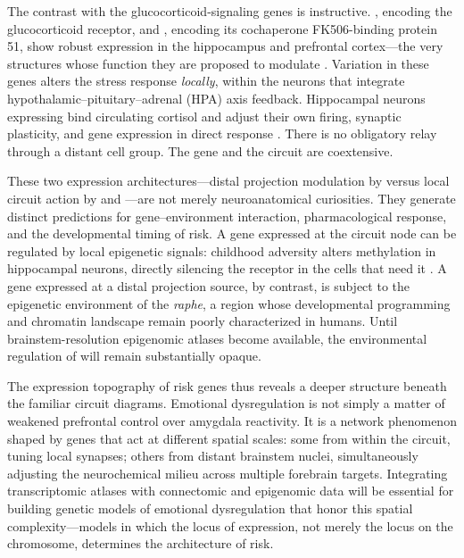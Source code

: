 The contrast with the glucocorticoid-signaling genes is instructive.
, encoding the glucocorticoid receptor, and , encoding
its cochaperone FK506-binding protein 51, show robust expression in the
hippocampus and prefrontal cortex---the very structures whose function they are
proposed to modulate \cite{perlman2007glucocorticoid, binder2009association}.
Variation in these genes alters the stress response \emph{locally}, within the
neurons that integrate hypothalamic--pituitary--adrenal (HPA) axis feedback.
Hippocampal neurons expressing  bind circulating cortisol and
adjust their own firing, synaptic plasticity, and gene expression in direct
response \cite{deangelis2019glucocorticoids}. There is no obligatory relay
through a distant cell group. The gene and the circuit are coextensive.

These two expression architectures---distal projection modulation by
 versus local circuit action by  and
---are not merely neuroanatomical curiosities. They generate
distinct predictions for gene--environment interaction, pharmacological
response, and the developmental timing of risk. A gene expressed at the circuit
node can be regulated by local epigenetic signals: childhood adversity alters
 methylation in hippocampal neurons, directly silencing the
receptor in the cells that need it \cite{mcgowan2009epigenetic}. A gene
expressed at a distal projection source, by contrast, is subject to the
epigenetic environment of the \emph{raphe}, a region whose developmental
programming and chromatin landscape remain poorly characterized in humans.
Until brainstem-resolution epigenomic atlases become available, the
environmental regulation of  will remain substantially opaque.

The expression topography of risk genes thus reveals a deeper structure beneath
the familiar circuit diagrams. Emotional dysregulation is not simply a matter
of weakened prefrontal control over amygdala reactivity. It is a network
phenomenon shaped by genes that act at different spatial scales: some from
within the circuit, tuning local synapses; others from distant brainstem nuclei,
simultaneously adjusting the neurochemical milieu across multiple forebrain
targets. Integrating transcriptomic atlases with connectomic and epigenomic
data will be essential for building genetic models of emotional dysregulation
that honor this spatial complexity---models in which the locus of expression,
not merely the locus on the chromosome, determines the architecture of risk.
